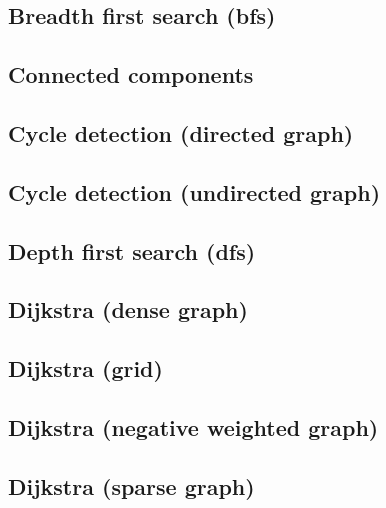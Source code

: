 \subsection{Breadth first search (bfs)}
\raggedbottom
\hrulefill
\subsection{Connected components}
\raggedbottom
\hrulefill
\subsection{Cycle detection (directed graph)}
\raggedbottom
\hrulefill
\subsection{Cycle detection (undirected graph)}
\raggedbottom
\hrulefill
\subsection{Depth first search (dfs)}
\raggedbottom
\hrulefill
\subsection{Dijkstra (dense graph)}
\raggedbottom
\hrulefill
\subsection{Dijkstra (grid)}
\raggedbottom
\hrulefill
\subsection{Dijkstra (negative weighted graph)}
\raggedbottom
\hrulefill
\subsection{Dijkstra (sparse graph)}
\raggedbottom
\hrulefill

